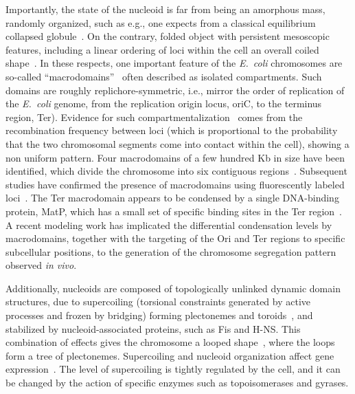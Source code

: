 \documentclass[
preprint,
a4paper,
12pt,
superscriptaddress,
pre]{revtex4}
\begin{document}
Importantly, the state of the nucleoid is far from being an amorphous
mass, randomly organized, such as e.g., one expects from a classical
equilibrium collapsed globule~\cite{Mirny2011}. On the contrary,
folded object with persistent mesoscopic features, including a linear
ordering of loci within the cell an overall coiled
shape~\cite{WLP+06,Wiggins2010,HadizadehYazdi2012,Fisher2013,Pelletier2012}.
In these respects, one important feature of the \emph{E.~coli}
chromosomes are so-called ``macrodomains''~\cite{VPR+04,MRB05,EB06}
often described as isolated compartments. Such domains are roughly
replichore-symmetric, i.e., mirror the order of replication of the
\emph{E.~coli} genome, from the replication origin locus, oriC, to the
terminus region, Ter). Evidence for such
compartmentalization~\cite{VPR+04} comes from the recombination
frequency between loci (which is proportional to the probability that
the two chromosomal segments come into contact within the cell),
showing a non uniform pattern.
%
Four macrodomains of a few hundred Kb in size have been identified,
which divide the chromosome into six contiguous
regions~\cite{Dame2011,Benza2012}.  Subsequent studies have confirmed
the presence of macrodomains using fluorescently labeled
loci~\cite{EMB08,EB06,LMB+05}. The Ter macrodomain appears to be
condensed by a single DNA-binding protein, MatP, which has a small set
of specific binding sites in the Ter region~\cite{Mercier2008}.
A recent modeling work has implicated the differential condensation
levels by macrodomains, together with the targeting of the Ori and Ter
regions to specific subcellular positions, to the generation of the
chromosome segregation pattern observed \emph{in
  vivo}\cite{Junier2013}.

Additionally, nucleoids are composed of topologically unlinked dynamic
domain structures, due to supercoiling (torsional constraints
generated by active processes and frozen by bridging) forming
plectonemes and toroids~\cite{Trun1998}, and stabilized by
nucleoid-associated proteins, such as Fis and H-NS. This combination
of effects gives the chromosome a looped
shape~\cite{Postow2004,Skoko2006,Kavenoff1976}, where the loops form a
tree of plectonemes. Supercoiling and nucleoid organization affect
gene expression~\cite{Breier2004,Postow2004,Dillon2010}.
The level of supercoiling is tightly regulated by the cell, and it can
be changed by the action of specific enzymes such as topoisomerases
and gyrases.
\end{document}
